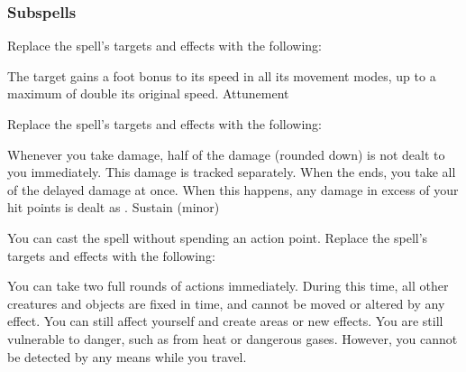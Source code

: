 \subsubsection{Subspells}
Replace the spell's targets and effects with the following:
\begin{spellcontent}
\begin{augmenttargetinginfo}
\end{augmenttargetinginfo}
\begin{augmenteffects}
\spelleffect
The target gains a  foot bonus to its speed in all its movement modes, up to a maximum of double its original speed.
\spelldur Attunement
\end{augmenteffects}
\end{spellcontent}
Replace the spell's targets and effects with the following:
\begin{spellcontent}
\begin{augmenttargetinginfo}
\end{augmenttargetinginfo}
\begin{augmenteffects}
\spelleffect
Whenever you take damage, half of the damage (rounded down) is not dealt to you immediately.
This damage is tracked separately.
When the ends, you take all of the delayed damage at once.
When this happens, any damage in excess of your hit points is dealt as .
\spelldur Sustain (minor)
\end{augmenteffects}
\end{spellcontent}
You can cast the spell without spending an action point.
Replace the spell's targets and effects with the following:
\begin{spellcontent}
\begin{augmenttargetinginfo}
\end{augmenttargetinginfo}
\begin{augmenteffects}
\spelleffect
You can take two full rounds of actions immediately.
During this time, all other creatures and objects are fixed in time, and cannot be moved or altered by any effect.
You can still affect yourself and create areas or new effects.
You are still vulnerable to danger, such as from heat or dangerous gases. However, you cannot be detected by any means while you travel.
\end{augmenteffects}
\end{spellcontent}

